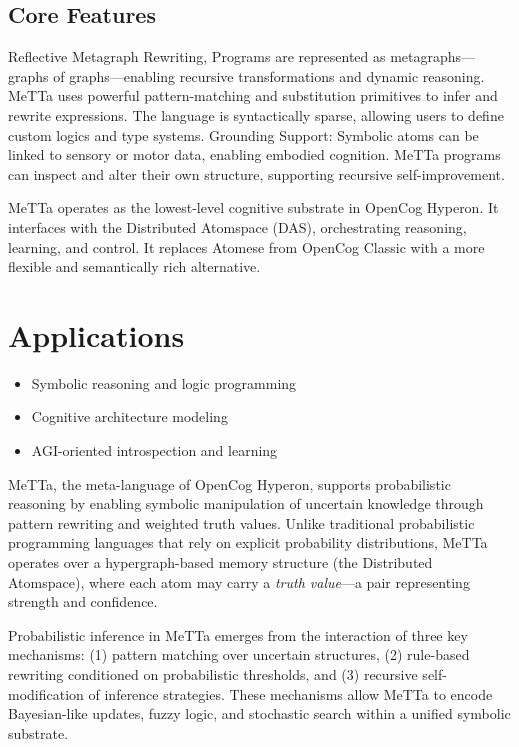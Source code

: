 \documentclass{article}
\begin{document}
\subsection{Core Features}

Reflective Metagraph Rewriting, Programs are represented as metagraphs---graphs of graphs---enabling recursive transformations and dynamic reasoning. MeTTa uses powerful pattern-matching and substitution primitives to infer and rewrite expressions. The language is syntactically sparse, allowing users to define custom logics and type systems. Grounding Support: Symbolic atoms can be linked to sensory or motor data, enabling embodied cognition.
 MeTTa programs can inspect and alter their own structure, supporting recursive self-improvement.

MeTTa operates as the lowest-level cognitive substrate in OpenCog Hyperon. It interfaces with the Distributed Atomspace (DAS), orchestrating reasoning, learning, and control. It replaces Atomese from OpenCog Classic with a more flexible and semantically rich alternative.

\section*{Applications}
\begin{itemize}
  \item Symbolic reasoning and logic programming
  \item Cognitive architecture modeling
  \item AGI-oriented introspection and learning
\end{itemize}

MeTTa, the meta-language of OpenCog Hyperon, supports probabilistic reasoning by enabling symbolic manipulation of uncertain knowledge through pattern rewriting and weighted truth values. Unlike traditional probabilistic programming languages that rely on explicit probability distributions, MeTTa operates over a hypergraph-based memory structure (the Distributed Atomspace), where each atom may carry a \textit{truth value}---a pair representing strength and confidence.

Probabilistic inference in MeTTa emerges from the interaction of three key mechanisms: (1) pattern matching over uncertain structures, (2) rule-based rewriting conditioned on probabilistic thresholds, and (3) recursive self-modification of inference strategies. These mechanisms allow MeTTa to encode Bayesian-like updates, fuzzy logic, and stochastic search within a unified symbolic substrate.
\end{document}
